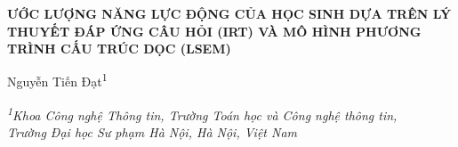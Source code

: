 
\begin{center}
{\fontsize{11}{13}\bfseries\selectfont
ƯỚC LƯỢNG NĂNG LỰC ĐỘNG CỦA HỌC SINH DỰA TRÊN LÝ THUYẾT ĐÁP ỨNG CÂU HỎI (IRT) VÀ MÔ HÌNH PHƯƠNG TRÌNH CẤU TRÚC DỌC (LSEM)}
\end{center}
\vspace{-6pt}
\begin{center}
{\fontsize{12}{14}\selectfont
Nguyễn Tiến Đạt\textsuperscript{1}}
\end{center}
\vspace{-6pt}
\begin{center}
{\fontsize{11}{13}\itshape\selectfont
\textsuperscript{1}Khoa Công nghệ Thông tin, Trường Toán học và Công nghệ thông tin,\\
Trường Đại học Sư phạm Hà Nội, Hà Nội, Việt Nam}
\end{center}

\begingroup
\renewcommand{\thefootnote}{}
\renewcommand{\footnoterule}{\vspace*{-3pt}\noindent\rule{0.3\linewidth}{0.4pt}\vspace*{2.6pt}}
\endgroup

\vspace{4pt}

